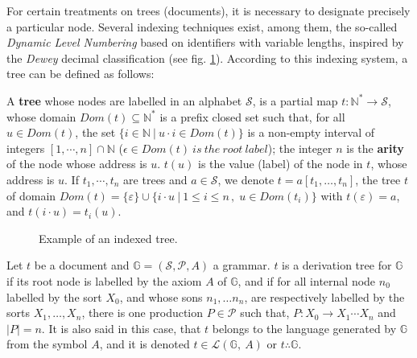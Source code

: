 For certain treatments on trees (documents), it is necessary to designate precisely a particular node. Several indexing techniques exist, among them, the so-called \textit{Dynamic Level Numbering} \cite{boe04} based on identifiers with variable lengths, inspired by the \textit{Dewey} decimal classification (see fig. \ref{chap2:fig:indexed-tree}). According to this indexing system, a tree can be defined as follows:

\begin{definition}
A \textbf{tree} whose nodes are labelled in an alphabet $\mathcal{S}$, is a partial map $t:\mathbb{N}^*\rightarrow \mathcal{S}$, whose domain $\mathit{Dom}(t)\subseteq \mathbb{N}^*$ is a prefix closed set such that, for all $u\in \mathit{Dom}(t)$, the set $\{i\in\mathbb{N}~|~u\cdot i\in\mathit{Dom}(t)\}$ is a non-empty interval of integers $[1,\cdots,n]\cap\mathbb{N}$ ($\epsilon \in \mathit{Dom}(t) \mathit{~is~ the~ root~ label}$); the integer $n$ is the \textbf{arity} of the node whose address is $u$. 
$t(u)$ is the value (label) of the node in $t$, whose address is $u$.
If $t_1,\cdots,t_n$ are trees and $a\in \mathcal{S}$, we denote $t = a [t_1,\ldots,t_n]$, the tree $t$ of domain $\mathit{Dom}(t)=\{\varepsilon\}\cup\{i\cdot u~|~1\leq i\leq n\, ,\; u\in \mathit{Dom}(t_i)\}$ with $t(\varepsilon)=a$, and $t(i\cdot u)=t_i(u)$. 

\end{definition}
\begin{figure}[ht!]
	\noindent
	\caption{Example of an indexed tree.}
	\label{chap2:fig:indexed-tree}
\end{figure}

Let $t$ be a document and $\mathbb{G}=\left(\mathcal{S},\mathcal{P},A\right)$ a grammar. $t$ is a derivation tree for $\mathbb{G}$ if its root node is labelled by the axiom $A$ of $\mathbb{G}$, and if for all internal node $n_0$ labelled by the sort $X_0$, and whose sons $n_1, \ldots n_n$, are respectively labelled by the sorts $X_1,\ldots, X_n$, there is one production $P \in \mathcal{P}$ such that, $P:X_0\rightarrow X_1\cdots X_n$ and $\left|P\right|=n$. 
It is also said in this case, that $t$ belongs to the language generated by $\mathbb{G}$ from the symbol $A$, and it is denoted $t \in \mathscr{L}{\left( \mathbb{G}, ~A \right)}$ or  $t\therefore \mathbb{G}$.

